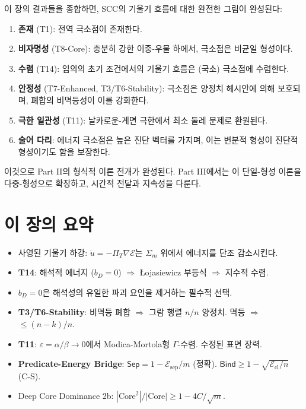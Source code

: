 이 장의 결과들을 종합하면, SCC의 기울기 흐름에 대한 완전한 그림이 완성된다:

\begin{enumerate}
    \item \textbf{존재} (T1): 전역 극소점이 존재한다.
    \item \textbf{비자명성} (T8-Core): 충분히 강한 이중-우물 하에서, 극소점은 비균일 형성이다.
    \item \textbf{수렴} (T14): 임의의 초기 조건에서의 기울기 흐름은 (국소) 극소점에 수렴한다.
    \item \textbf{안정성} (T7-Enhanced, T3/T6-Stability): 극소점은 양정치 헤시안에 의해 보호되며, 폐합의 비멱등성이 이를 강화한다.
    \item \textbf{극한 일관성} (T11): 날카로운-계면 극한에서 최소 둘레 문제로 환원된다.
    \item \textbf{술어 다리}: 에너지 극소점은 높은 진단 벡터를 가지며, 이는 변분적 형성이 진단적 형성이기도 함을 보장한다.
\end{enumerate}

이것으로 Part II의 형식적 이론 전개가 완성된다. Part III에서는 이 단일-형성 이론을 다중-형성으로 확장하고, 시간적 전달과 지속성을 다룬다.


\section*{이 장의 요약}

\begin{itemize}
    \item 사영된 기울기 하강: $\dot{u} = -\Pi_T \nabla \mathcal{E}$는 $\Sigma_m$ 위에서 에너지를 단조 감소시킨다.
    \item \textbf{T14}: 해석적 에너지 ($b_D = 0$) $\Rightarrow$ \L{}ojasiewicz 부등식 $\Rightarrow$ 지수적 수렴.
    \item $b_D = 0$은 해석성의 유일한 파괴 요인을 제거하는 필수적 선택.
    \item \textbf{T3/T6-Stability}: 비멱등 폐합 $\Rightarrow$ 그람 행렬 $n/n$ 양정치. 멱등 $\Rightarrow$ $\leq (n-k)/n$.
    \item \textbf{T11}: $\varepsilon = \alpha/\beta \to 0$에서 Modica-Mortola형 $\Gamma$-수렴. 수정된 표면 장력.
    \item \textbf{Predicate-Energy Bridge}: $\mathsf{Sep} = 1 - \mathcal{E}_{\mathrm{sep}}/m$ (정확). $\mathsf{Bind} \geq 1 - \sqrt{\mathcal{E}_{\mathrm{cl}}/n}$ (C-S).
    \item Deep Core Dominance 2b: $|\mathrm{Core}^2|/|\mathrm{Core}| \geq 1 - 4C/\sqrt{m}$.
\end{itemize}
